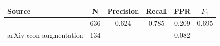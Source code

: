 \begin{tabular}{lccccc}
\toprule
Source                                       & N    & Precision      & Recall         & FPR             & $F_1$          \\
\midrule
\citet{walters_wilder_2023}              & 636 & 0.624 & 0.785 & 0.209 & 0.695 \\
arXiv econ augmentation                      & 134 & ---            & ---            & 0.082 & ---            \\
\bottomrule
\end{tabular}
